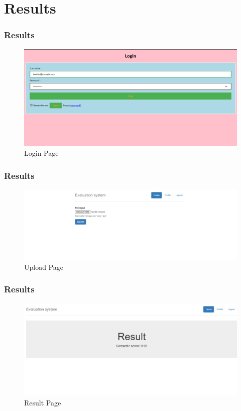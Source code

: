 \section{Results}

\begin{frame}
    \frametitle{Results}
    \begin{figure}[!htb]
        \centering
        \includegraphics[scale=0.3]{images/login.png}
        \caption{Login Page}
    \end{figure}

\end{frame}

\begin{frame}
    \frametitle{Results}
    \begin{figure}[!htb]
        \centering
        \includegraphics[scale=0.4]{images/upload.png}
        \caption{Upload Page}
    \end{figure}

\end{frame}


\begin{frame}
    \frametitle{Results}
    \begin{figure}[!htb]
        \centering
        \includegraphics[scale=0.3]{images/result.png}
        \caption{Result Page}
    \end{figure}

\end{frame}

